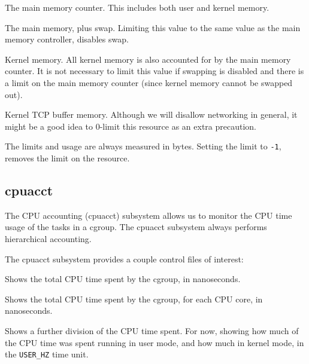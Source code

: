 \begin{description}[\setleftmargin{0.2in}\breaklabel\setlabelstyle{\tt}]

\item[memory]

The main memory counter. This includes both user and kernel memory.

\item[memory.memsw]

The main memory, plus swap. Limiting this value to the same value as the main
memory controller, disables swap.

\item[memory.kmem]

Kernel memory. All kernel memory is also accounted for by the main memory
counter. It is not necessary to limit this value if swapping is disabled and
there is a limit on the main memory counter (since kernel memory cannot be
swapped out).

\item[memory.kmem.tcp]

Kernel TCP buffer memory. Although we will disallow networking in general, it
might be a good idea to 0-limit this resource as an extra precaution.

\end{description}

The limits and usage are always measured in bytes. Setting the limit to
\texttt{-1}, removes the limit on the resource.

\subsection{cpuacct}

The CPU accounting (cpuacct) subsystem allows us to monitor the CPU time usage
of the tasks in a cgroup\cite{cpuacct.txt}. The cpuacct subsystem always
performs hierarchical accounting.

The cpuacct subsystem provides a couple control files of interest:

\begin{description}[\setleftmargin{0.2in}\breaklabel\setlabelstyle{\tt}]

\item[cpuacct.usage] Shows the total CPU time spent by the cgroup, in
nanoseconds.

\item[cpuacct.usage\_percpu] Shows the total CPU time spent by the cgroup, for
each CPU core, in nanoseconds.

\item[cpuacct.stat] Shows a further division of the CPU time spent. For now,
showing how much of the CPU time was spent running in user mode, and how much
in kernel mode, in the \texttt{USER\_HZ} time unit.

\end{description}

